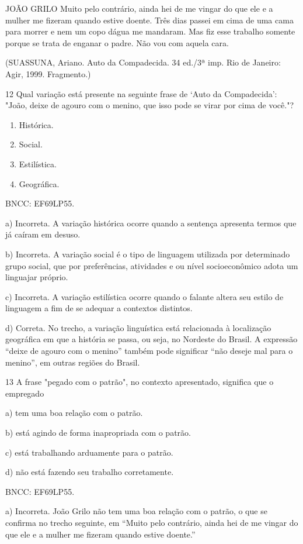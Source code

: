 {JOÃO GRILO Muito pelo contrário, ainda hei de me vingar do que ele e a
mulher me fizeram quando estive doente. Três dias passei em cima de uma
cama para morrer e nem um copo dágua me mandaram. Mas fiz esse trabalho
somente porque se trata de enganar o padre. Não vou com aquela cara.

(SUASSUNA, Ariano. Auto da Compadecida. 34 ed./3ª imp. Rio de Janeiro:
Agir, 1999. Fragmento.)

\num{12} Qual variação está presente na seguinte frase de `Auto da
Compadecida': "João, deixe de agouro com o menino, que isso pode se
virar por cima de você."?

\begin{enumerate}
\def\labelenumi{\alph{enumi})}
\item
  Histórica.
\item
  Social.
\item
  Estilística.
\item
  Geográfica.
\end{enumerate}

BNCC: EF69LP55.

a) Incorreta. A variação histórica ocorre quando a sentença apresenta
termos que já caíram em desuso.

b) Incorreta. A variação social é o tipo de linguagem utilizada por
determinado grupo social, que por preferências, atividades e ou nível
socioeconômico adota um linguajar próprio.

c) Incorreta. A variação estilística ocorre quando o falante altera seu
estilo de linguagem a fim de se adequar a contextos distintos.

d) Correta. No trecho, a variação linguística está relacionada à
localização geográfica em que a história se passa, ou seja, no Nordeste
do Brasil. A expressão ``deixe de agouro com o menino'' também pode
significar ``não deseje mal para o menino'', em outras regiões do
Brasil.

\num{13} A frase "pegado com o patrão", no contexto apresentado,
significa que o empregado

a) tem uma boa relação com o patrão.

b) está agindo de forma inapropriada com o patrão.

c) está trabalhando arduamente para o patrão.

d) não está fazendo seu trabalho corretamente.

BNCC: EF69LP55.

a) Incorreta. João Grilo não tem uma boa relação com o patrão, o que se
confirma no trecho seguinte, em ``Muito pelo contrário, ainda hei de me
vingar do que ele e a mulher me fizeram quando estive doente.''

}
